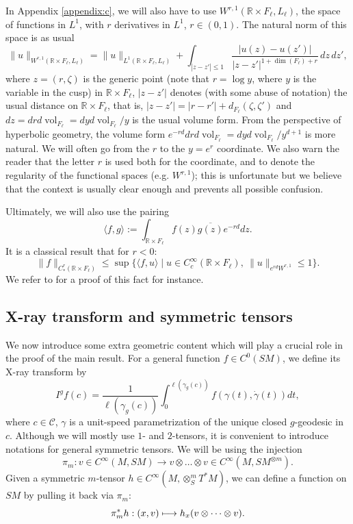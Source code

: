 \documentclass[JEP,XML,SOM,Unicode,NoFloatCountersInSection]{cedram}
\newcommand\mto{\mathchoice{\longmapsto}{\mapsto}{\mapsto}{\mapsto}}
\newcommand{\R}{\mathbb{R}}
\newcommand{\mc}{\mathcal}
\DeclareMathOperator{\vol}{\mathrm{vol}}
\theoremstyle{plain}
\theoremstyle{definition}
\begin{document}
In Appendix \ref{appendix:c}, we will also have to use $W^{r,1}(\R\times F_\ell,L_\ell)$, the space of functions in $L^1$, with $r$ derivatives in $L^1$, $r\in(0,1)$. The natural norm of this space is as usual
\begin{equation}\label{eq:norm-W^1,r}
\|u\|_{W^{r,1}(\R\times F_\ell,L_\ell)} = \|u\|_{L^1(\R\times F_\ell,L_\ell)} + \int_{|z-z'|\leq 1} \frac{|u(z)-u(z')|}{|z-z'|^{1+\dim(F_\ell)+r}} \,dz \,dz',
\end{equation}
where $z=(r,\zeta)$ is the generic point {\color{black}(note that $r=\log y$, where $y$ is the variable in the cusp)} in $\R\times F_\ell$, $|z-z'|$ denotes (with some abuse of notation) the usual distance on $\R\times F_\ell$, that is, $|z-z'| = |r-r'| + d_{F_\ell}(\zeta,\zeta')$ and $dz= dr d\vol_{F_\ell}=dy d\vol_{F_\ell}/y$ is the usual volume form. From the perspective of hyperbolic geometry, the volume form $e^{-rd} dr d\vol_{F_\ell} = dy d\vol_{F_\ell}/y^{d+1}$ is more natural. We will often go from the $r$ to the $y=e^r$ coordinate. {\color{black}We also warn the reader that the letter $r$ is used both for the coordinate, and to denote the regularity of the functional spaces (e.g. $W^{r,1}$); this is unfortunate but we believe that the context is usually clear enough and prevents all possible confusion.}

Ultimately, we will also use the pairing
\[
\langle f, g\rangle := \int_{\R\times F_\ell} f(z)\overline{g(z)}e^{-rd}dz.
\]
It is a classical result that for $r<0$:
\begin{equation}\label{eq:duality-C-s}
\|f \|_{C_\ast^r(\R\times F_\ell)} \leq \sup \{ \langle f, u\rangle\mid u\in C^\infty_c(\R\times F_\ell),\ \|u\|_{e^{rd} W^{r,1}}\leq 1 \}.
\end{equation}
We refer to \cite[Prop.\,2.76]{Bahouri-Chemin-Danchin-2011} for a proof of this fact for instance.

\subsection{X-ray transform and symmetric tensors}

\label{sssection:intro-tensors}

We now introduce some extra geometric content which will play a crucial role in the proof of the main result. For a general function $f\in C^0(SM)$, we define its X-ray transform by
\[
I^gf(c) = \frac{1}{\ell(\gamma_g(c))} \int_{0}^{\ell(\gamma_g(c))} f(\gamma(t),\dot{\gamma}(t)) dt,
\]
where $c \in \mc{C}$, $\gamma$ is a unit-speed parametrization of the unique closed $g$-geodesic in $c$. Although we will mostly use $1$- and $2$-tensors, it is convenient to introduce notations for general symmetric tensors. We will be using the injection
\[
\pi_m : v \in C^\infty(M, SM) \to v \otimes \dots \otimes v \in C^\infty(M, SM^{\otimes m}).
\]
Given a symmetric $m$-tensor $h\in C^\infty(M,\otimes^m_S T^\ast M)$, we can define a function on $SM$ by pulling it back via $\pi_m$:
\[
\pi_m^\ast h: (x,v) \mto h_x ( v \otimes \dots \otimes v).
\]
\end{document}
